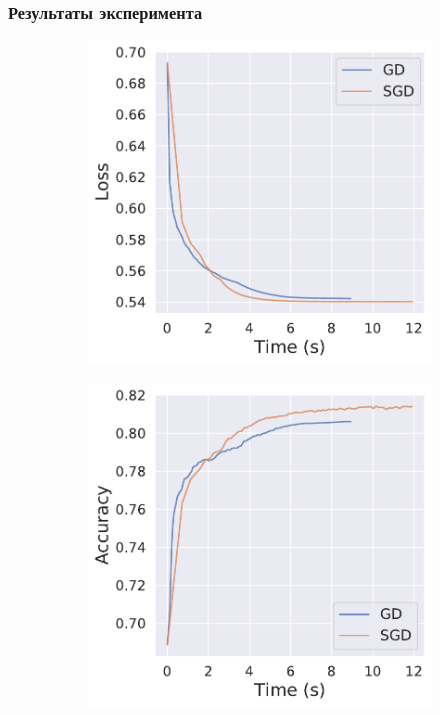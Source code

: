 \subsubsection{Результаты эксперимента}
\begin{figure}[h]
	\begin{subfigure}{.5\textwidth}
		\centering
		\includegraphics[width=\linewidth]{./experiment3/loss_time.pdf}
		\caption{}
	\end{subfigure}%
	\begin{subfigure}{.5\textwidth}
		\centering
		\includegraphics[width=\linewidth]{./experiment3/acc_time.pdf}
		\caption{}
	\end{subfigure}
\caption{}\label{eq:exp3_fig1}
\end{figure}

